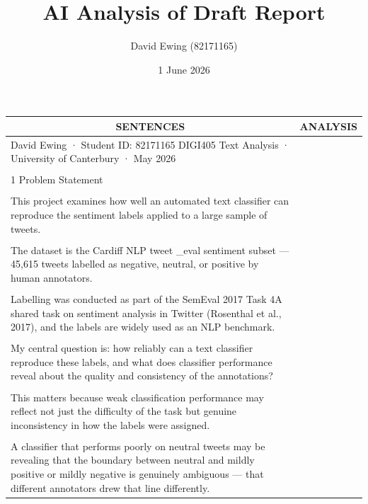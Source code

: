 \documentclass[11pt]{article}
\title{AI Analysis of Draft Report}
\author{David Ewing (82171165)}
\date{1 June 2026}
\begin{document}
\maketitle
\thispagestyle{empty}
\newpage

\begin{longtable}{|p{}|p{}|}
\hline
\multicolumn{1}{|c|}{\textbf{SENTENCES}} & \multicolumn{1}{c|}{\textbf{ANALYSIS}} \\[2pt]
\hline
\endhead
David Ewing · Student ID: 82171165 DIGI405 Text Analysis · University of Canterbury · May 2026 & \\[2pt]
\hline
\rule{0pt}{3.5cm} & \\
\hline
1 Problem Statement & \\[2pt]
\hline
\rule{0pt}{3.5cm} & \\
\hline
This project examines how well an automated text classifier can reproduce the sentiment labels applied to a large sample of tweets. & \\[2pt]
\hline
\rule{0pt}{3.5cm} & \\
\hline
The dataset is the Cardiff NLP tweet \_eval sentiment subset --- 45,615 tweets labelled as negative, neutral, or positive by human annotators. & \\[2pt]
\hline
\rule{0pt}{3.5cm} & \\
\hline
Labelling was conducted as part of the SemEval 2017 Task 4A shared task on sentiment analysis in Twitter (Rosenthal et al., 2017), and the labels are widely used as an NLP benchmark. & \\[2pt]
\hline
\rule{0pt}{3.5cm} & \\
\hline
My central question is: how reliably can a text classifier reproduce these labels, and what does classifier performance reveal about the quality and consistency of the annotations? & \\[2pt]
\hline
\rule{0pt}{3.5cm} & \\
\hline
This matters because weak classification performance may reflect not just the difficulty of the task but genuine inconsistency in how the labels were assigned. & \\[2pt]
\hline
\rule{0pt}{3.5cm} & \\
\hline
A classifier that performs poorly on neutral tweets may be revealing that the boundary between neutral and mildly positive or mildly negative is genuinely ambiguous --- that different annotators drew that line differently. & \\[2pt]

\end{longtable}
\end{document}
